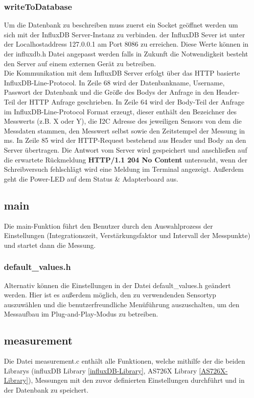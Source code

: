 \subsubsection{writeToDatabase}
Um die Datenbank zu beschreiben muss zuerst ein Socket geöffnet werden um sich mit der InfluxDB Server-Instanz  zu verbinden.
der InfluxDB Sever ist unter der Localhostaddress 127.0.0.1 am Port 8086 zu erreichen.
	Diese Werte können in der influxdb.h Datei angepasst werden falls in Zukunft die Notwendigkeit besteht den Server auf einem externen Gerät zu betreiben.\\
Die Kommunikation mit dem InfluxDB Server erfolgt über das HTTP basierte InfluxDB-Line-Protocol.
In Zeile 68 wird der Datenbankname, Username,  Passwort der Datenbank und die Größe des Bodys der Anfrage in den Header-Teil der HTTP Anfrage geschrieben.
In Zeile 64 wird der Body-Teil der Anfrage im InfluxDB-Line-Protocol Format erzeugt, dieser enthält den Bezeichner des Messwerts (z.B. X oder Y), die I2C Adresse des jeweiligen Sensors von dem die Messdaten stammen, den Messwert selbst sowie den Zeitstempel der Messung in ms.	
In Zeile 85 wird der HTTP-Request bestehend aus Header und Body an den Server übertragen.
Die Antwort vom Server wird gespeichert und anschließen auf die erwartete Rückmeldung \textbf{HTTP/1.1 204 No Content } untersucht, wenn der Schreibversuch fehlschlägt wird eine Meldung im Terminal angezeigt.
Außerdem geht die Power-LED auf dem Status \& Adapterboard aus.
\subsection{main}\label{main}
Die main-Funktion führt den Benutzer durch den Auswahlprozess der Einstellungen (Integrationszeit, Verstärkungsfaktor und Intervall der Messpunkte) und startet dann die Messung.\\
\subsubsection{default\_values.h}
\noindent Alternativ können die Einstellungen in der Datei default\_values.h geändert werden. Hier ist es außerdem möglich, den zu verwendenden Sensortyp auszuwählen und die benutzerfreundliche Menüführung auszuschalten, um den Messaufbau im Plug-and-Play-Modus zu betreiben.\\



\subsection{measurement}\label{measurement-c}
Die Datei measurement.c enthält alle Funktionen, welche mithilfe der die beiden Librarys (influxDB Library \ref{influxDB-Library}, AS726X Library \ref{AS726X-Library}),  Messungen mit den zuvor definierten Einstellungen durchführt und in der Datenbank zu speichert.

